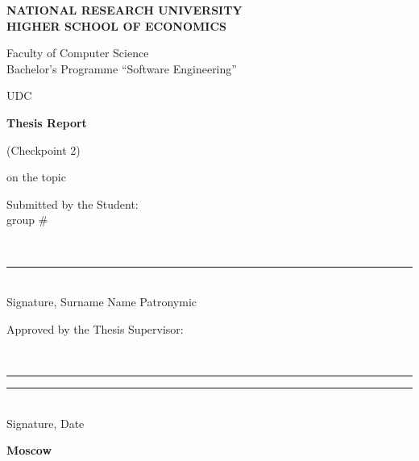 %
\begin{titlepage}
\thispagestyle{empty}
\singlespacing
\footnotesize
\setlength{\parindent}{0pt}
\setlength{\parskip}{0pt}

\begin{center}
\textbf{NATIONAL RESEARCH UNIVERSITY}\\
\textbf{HIGHER SCHOOL OF ECONOMICS}

\vspace{0.35cm}
Faculty of Computer Science\\
Bachelor's Programme ``Software Engineering''
\end{center}

\vspace{0.3cm}
\noindent
UDC~\hseUDC

\vspace{1.6cm}
\begin{center}
\textbf{\normalsize Thesis Report}

\vspace{0.12cm}
(Checkpoint 2)

\vspace{0.45cm}
on the topic
\underline{\makebox[0.9\textwidth][c]{\hseProjectName}}
\end{center}

\vspace{1.4cm}
\noindent
\begin{minipage}[t]{0.5\textwidth}
\raggedright
Submitted by the Student:\\
group \#\hseGroup

\vspace{0.25cm}
\strut\hseAuthorName\\[-0.05cm]
\rule{6cm}{0.4pt}\\[-0.05cm]
{\scriptsize Signature, Surname Name Patronymic}
\end{minipage}

\vspace{0.9cm}
\noindent
\begin{minipage}[t]{0.7\textwidth}
\raggedright
Approved by the Thesis Supervisor:\\
\strut\hseSupervisorName\\
\strut\hseSupervisorTitle

\vspace{0.25cm}
\rule{3.6cm}{0.4pt}\quad\rule{2.2cm}{0.4pt}\\[-0.05cm]
{\scriptsize Signature, Date}
\end{minipage}

\vfill
\begin{center}
\textbf{Moscow \hseYear}
\end{center}
\end{titlepage}
\clearpage
